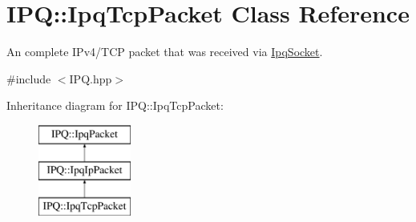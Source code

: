 \hypertarget{classIPQ_1_1IpqTcpPacket}{
\section{\-I\-P\-Q\-:\-:\-Ipq\-Tcp\-Packet \-Class \-Reference}
\label{classIPQ_1_1IpqTcpPacket}
}


\-An complete \-I\-Pv4/\-T\-C\-P packet that was received via \hyperlink{classIPQ_1_1IpqSocket}{\-Ipq\-Socket}.  




{\ttfamily \#include $<$\-I\-P\-Q.\-hpp$>$}

\-Inheritance diagram for \-I\-P\-Q\-:\-:\-Ipq\-Tcp\-Packet\-:\begin{figure}[H]
\begin{center}
\leavevmode
\includegraphics[height=3.000000cm]{classIPQ_1_1IpqTcpPacket}
\end{center}
\end{figure}
